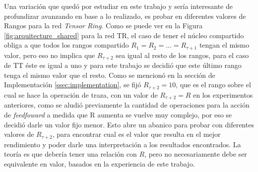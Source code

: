 \documentclass[spanish]{article}
\theoremstyle{definition}
\theoremstyle{remark}
\numberwithin{equation}{section}
\numberwithin{equation}{section} %
\begin{document}
Una variación que quedó por estudiar en este trabajo y sería interesante de profundizar avanzando en base a lo realizado, es probar en diferentes valores de Rangos para la red \textit{Tensor Ring}. Como se puede ver en la Figura \ref{fig:arquitecture_shared} para la red TR, el caso de tener el núcleo compartido obliga a que todos los rangos compartido $R_1=R_2=...=R_{\tau+1}$ tengan el mismo valor, pero eso no implica que $R_{\tau+2}$ sea igual al resto de los rangos, para el caso de TT éste es igual a uno y para este trabajo se decidió que este último rango tenga el mismo valor que el resto. Como se mencionó en la sección de Implementación \ref{ssec:implementation}, se fijó $R_{\tau+2}=10$, que es el rango sobre el cual se hace la operación de traza, con un valor de $R_{\tau+2}=R$ en los experimentos anteriores, como se aludió previamente la cantidad de operaciones para la acción de \textit{feedfoward} a medida que R aumenta se vuelve muy complejo, por eso se decidió darle un valor fijo menor. Esto abre un abanico para probar con diferentes valores de $R_{\tau+2}$, para encontrar cual es el valor que resulta en el mejor rendimiento y poder darle una interpretación a los resultados encontrados. La teoría es que debería tener una relación con $R$, pero no necesariamente debe ser equivalente en valor, basados en la experiencia de este trabajo.  
\par
\end{document}
